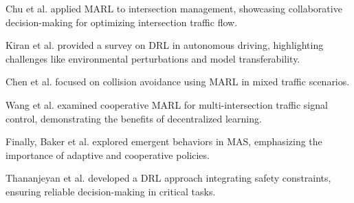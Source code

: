 Chu et al.\cite{chu2019multiagent} applied MARL to intersection management, showcasing collaborative decision-making for optimizing intersection 
traffic flow.

Kiran et al.\cite{kiran2021survey} provided a survey on DRL in autonomous driving, highlighting challenges like environmental 
perturbations and model transferability. 

Chen et al.\cite{chen2021collisionavoidance} focused on collision avoidance using MARL in mixed traffic scenarios. 

Wang et al.\cite{wang2020multiintersection} examined cooperative MARL for multi-intersection traffic signal control, demonstrating the benefits of decentralized learning. 

Finally, Baker et al.\cite{baker2020emergent} explored emergent behaviors in MAS, emphasizing the importance of adaptive and cooperative policies. 

Thananjeyan et al.\cite{thananjeyan2021} developed a DRL approach integrating safety constraints, ensuring reliable decision-making in 
critical tasks.


